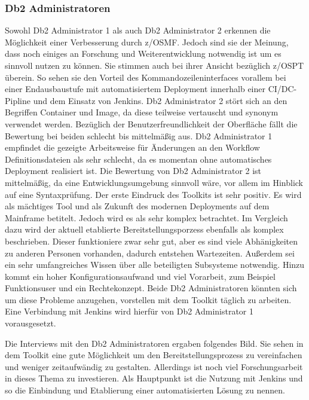 \subsubsection{Db2 Administratoren}
Sowohl Db2 Administrator 1 als auch Db2 Administrator 2 erkennen die Möglichkeit einer Verbesserung durch z/OSMF.
Jedoch sind sie der Meinung, dass noch einiges an Forschung und Weiterentwicklung notwendig ist um es sinnvoll nutzen zu können.
Sie stimmen auch bei ihrer Ansicht bezüglich z/OSPT überein.
So sehen sie den Vorteil des Kommandozeileninterfaces vorallem bei einer Endausbaustufe mit automatisiertem Deployment innerhalb einer CI/DC-Pipline und dem Einsatz von Jenkins.
Db2 Administrator 2 stört sich an den Begriffen \glqq Container\grqq{} und \glqq Image\grqq, da diese teilweise vertauscht und synonym verwendet werden.
Bezüglich der Benutzerfreundlichkeit der Oberfläche fällt die Bewertung bei beiden schlecht bis mittelmäßig aus.
Db2 Administrator 1 empfindet die gezeigte Arbeitsweise für Änderungen an den Workflow Definitionsdateien als sehr schlecht, da es momentan ohne automatisches Deployment realisiert ist.
Die Bewertung von Db2 Administrator 2 ist mittelmäßig, da eine Entwicklungsumgebung sinnvoll wäre, vor allem im Hinblick auf eine Syntaxprüfung.
Der erste Eindruck des Toolkits ist sehr positiv.
Es wird als mächtiges Tool und als Zukunft des modernen Deployments auf dem Mainframe betitelt.
Jedoch wird es als sehr komplex betrachtet.
Im Vergleich dazu wird der aktuell etablierte Bereitstellungsporzess ebenfalls als komplex beschrieben.
Dieser funktioniere zwar sehr gut, aber es sind viele Abhänigkeiten zu anderen Personen vorhanden, dadurch entstehen Wartezeiten.
Außerdem sei ein sehr umfangreiches Wissen über alle beteiligten Subsysteme notwendig.
Hinzu kommt ein hoher Konfigurationsaufwand und viel Vorarbeit, zum Beispiel Funktionsuser und ein Rechtekonzept.
Beide Db2 Administratoren könnten sich um diese Probleme anzugehen, vorstellen mit dem Toolkit täglich zu arbeiten.
Eine Verbindung mit Jenkins wird hierfür von Db2 Administrator 1 vorausgesetzt.

Die Interviews mit den Db2 Administratoren ergaben folgendes Bild.
Sie sehen in dem Toolkit eine gute Möglichkeit um den Bereitstellungsprozess zu vereinfachen und weniger zeitaufwändig zu gestalten.
Allerdings ist noch viel Forschungsarbeit in dieses Thema zu investieren.
Als Hauptpunkt ist die Nutzung mit Jenkins und so die Einbindung und Etablierung einer automatisierten Lösung zu nennen.

